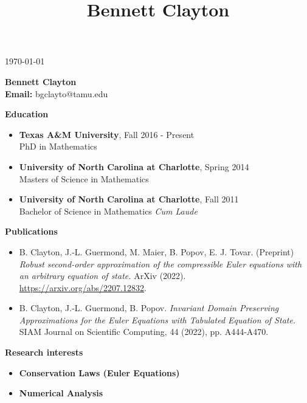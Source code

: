 \documentclass[letterpaper,10pt]{article}
\title{Bennett Clayton}
\newcommand{\resheading}[1]{{\large \colorbox{mygrey}{\begin{minipage}{\textwidth}{\textbf{#1 \vphantom{p\^{E}}}}\end{minipage}}}}
\begin{document}
\hfill{\today\ }
\vspace{1cm}
\begin{center}
{\textbf{\LARGE Bennett Clayton}}\\
\vspace{.2cm}
\textbf{Email:} {\color{blue} bgclayto@tamu.edu}
\end{center}


\vspace{0.1in}

\resheading{Education}

\begin{itemize}
\item \textbf{Texas A\&M University}, \hfill Fall 2016 -
	Present \\PhD in Mathematics 
\vspace{0.1cm}

\item \textbf{University of North Carolina at Charlotte},
	\hfill Spring 2014 \\Masters of Science in
	Mathematics 
\vspace{0.1cm}

\item \textbf{University of North Carolina at Charlotte},
	\hfill Fall 2011 \\Bachelor of Science in
	Mathematics
\vspace{0.1cm}
\textit{Cum Laude}

\vspace{0.5cm}
\end{itemize}

\resheading{Publications}
\begin{itemize}
	\item B. Clayton, J.-L. Guermond, M. Maier, B.
		Popov, E. J. Tovar. (Preprint) \textit{Robust
		second-order approximation of the
	compressible Euler equations with an arbitrary
equation of state.} ArXiv (2022).
\url{https://arxiv.org/abs/2207.12832}.  
	\item B. Clayton, J.-L. Guermond, B. Popov.
		\textit{Invariant Domain Preserving
		Approximations for the Euler Equations with
	Tabulated Equation of State.} SIAM Journal on
	Scientific Computing, 44 (2022), pp. A444-A470.
\end{itemize}
\vspace{0.5cm}

\resheading{Research interests}

\begin{itemize}
\item \textbf{Conservation Laws (Euler Equations)}
\item \textbf{Numerical Analysis}
\end{itemize}
\vspace{0.5cm}
\end{document}
